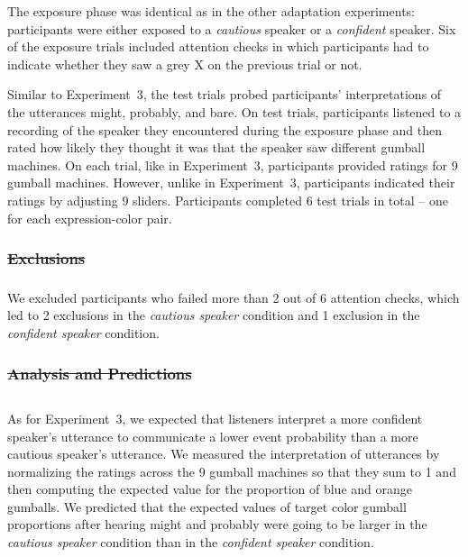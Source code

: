 \documentclass[man, floatsintext]{apa6}
\providecommand{\DIFadd}[1]{{\protect\color{blue}\uwave{#1}}} %
\providecommand{\DIFdel}[1]{{\protect\color{red}\sout{#1}}}                      %
\providecommand{\DIFaddbegin}{} %
\providecommand{\DIFaddend}{} %
\providecommand{\DIFdelbegin}{} %
\providecommand{\DIFdelend}{} %
\newcommand{\DIFscaledelfig}{0.5}
\newlength{\DIFdelgraphicswidth} %
\newlength{\DIFdelgraphicsheight} %
\newcommand{\DIFaddincludegraphics}[2][]{{\color{blue}\fbox{\DIFOincludegraphics[#1]{#2}}}} %
\newcommand{\DIFdelincludegraphics}[2][]{%
\sbox{\DIFdelgraphicsbox}{\DIFOincludegraphics[#1]{#2}}%
\settoboxwidth{\DIFdelgraphicswidth}{\DIFdelgraphicsbox} %
\settoboxtotalheight{\DIFdelgraphicsheight}{\DIFdelgraphicsbox} %
\scalebox{\DIFscaledelfig}{%
\parbox[b]{\DIFdelgraphicswidth}{\usebox{\DIFdelgraphicsbox}\\[-\baselineskip] \rule{\DIFdelgraphicswidth}{0em}}\llap{\resizebox{\DIFdelgraphicswidth}{\DIFdelgraphicsheight}{%
\setlength{\unitlength}{\DIFdelgraphicswidth}%
\begin{picture}(1,1)%
\thicklines\linethickness{2pt} %
{\color[rgb]{1,0,0}\put(0,0){\framebox(1,1){}}}%
{\color[rgb]{1,0,0}\put(0,0){\line( 1,1){1}}}%
{\color[rgb]{1,0,0}\put(0,1){\line(1,-1){1}}}%
\end{picture}%
}\hspace*{3pt}}} %
} %
\DeclareRobustCommand{\DIFaddbegin}{\DIFOaddbegin \let\includegraphics\DIFaddincludegraphics} %
\DeclareRobustCommand{\DIFaddend}{\DIFOaddend \let\includegraphics\DIFOincludegraphics} %
\DeclareRobustCommand{\DIFdelbegin}{\DIFOdelbegin \let\includegraphics\DIFdelincludegraphics} %
\DeclareRobustCommand{\DIFdelend}{\DIFOaddend \let\includegraphics\DIFOincludegraphics} %
\begin{document}
The exposure phase was identical as in the other adaptation experiments: participants were either exposed to a 
\textit{cautious} speaker or a \textit{confident} speaker. Six of the exposure trials included attention checks in which
participants had to indicate whether they saw a grey X on the previous trial or not.

Similar to Experiment~3, the test trials probed participants'
interpretations of the utterances {\sc might}, {\sc probably}, and {\sc bare}. On test trials, participants listened
to a recording of the speaker they encountered during the exposure phase and then rated how likely they
thought it was that the speaker saw different gumball machines. On each trial, like in Experiment~3, participants
provided ratings for 9 gumball machines. However, unlike in Experiment~3, participants indicated their ratings
by adjusting 9 sliders. Participants completed 6 test trials in total -- one for each expression-color pair.

\DIFdelbegin \subsubsection*{\DIFdel{Exclusions}}
\DIFdelend \DIFaddbegin \subsubsection{\DIFadd{Exclusions}}
\DIFaddend 

We excluded participants who failed more than 2 out of 6 attention checks, which led to 2 exclusions in the \emph{cautious speaker} condition and 1 exclusion in the \emph{confident speaker} condition.


\DIFdelbegin \subsubsection*{\DIFdel{Analysis and Predictions}}
\DIFdelend \DIFaddbegin \subsection{\DIFadd{Analysis and Predictions}}
\DIFaddend 

As for Experiment~3, we expected that listeners interpret a more confident speaker's utterance 
to communicate a lower event probability than a more cautious speaker's utterance. We measured
the interpretation of utterances by normalizing the ratings across the 9 gumball machines so that they sum to
1 and then computing the expected value for the proportion of blue and orange gumballs. 
We predicted that the expected values of target color gumball proportions after hearing {\sc might} and {\sc probably} 
were going to be larger in the \emph{cautious speaker} condition than in the \emph{confident speaker} condition.
\end{document}
